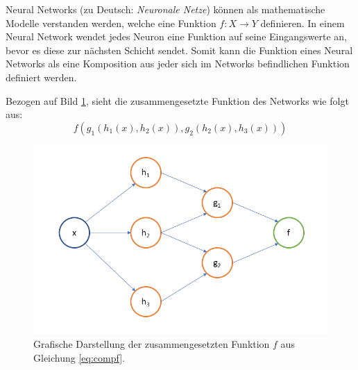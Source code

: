 Neural Networks (zu Deutsch: \textit{Neuronale Netze}) können als mathematische Modelle verstanden werden, welche eine Funktion $f : X \rightarrow Y$ definieren. In einem Neural Network wendet jedes Neuron eine Funktion auf seine Eingangswerte an, bevor es diese zur n\"achsten Schicht sendet. Somit kann die Funktion eines Neural Networks als eine Komposition aus jeder sich im Networks befindlichen Funktion definiert werden. 

Bezogen auf Bild \ref{fig:composedGraph}, sieht die zusammengesetzte Funktion des Networks wie folgt aus: 
\begin{equation}
\label{eq:compf}
f(g_1(h_1(x), h_2(x)),g_2(h_2(x), h_3(x)))
\end{equation}

\begin{figure}[ht]
\centering
\includegraphics[scale=0.4]{pictures/grafiken/Folie4}
\caption[Caption for LOF]{Grafische Darstellung der zusammengesetzten Funktion $f$ aus Gleichung \ref{eq:compf}.}
\label{fig:composedGraph}

\end{figure}

